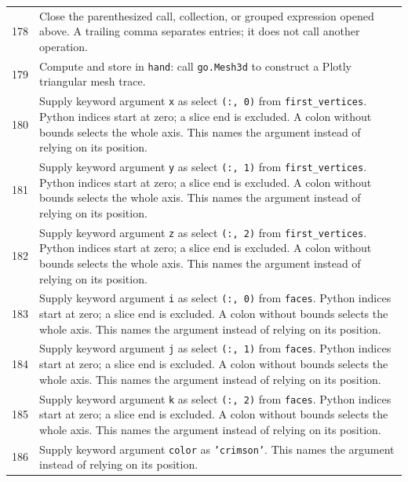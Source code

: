 \documentclass[11pt,a4paper]{book}
\begin{document}
\begin{longtable}{r p{}}
178 & Close the parenthesized call, collection, or grouped expression opened above. A trailing comma separates entries; it does not call another operation. \\

179 & Compute and store in \texttt{hand}: call \texttt{go.Mesh3d} to construct a Plotly triangular mesh trace.  \\

180 & Supply keyword argument \texttt{x} as select \texttt{(:, 0)} from \texttt{first\_vertices}. Python indices start at zero; a slice end is excluded. A colon without bounds selects the whole axis. This names the argument instead of relying on its position. \\

181 & Supply keyword argument \texttt{y} as select \texttt{(:, 1)} from \texttt{first\_vertices}. Python indices start at zero; a slice end is excluded. A colon without bounds selects the whole axis. This names the argument instead of relying on its position. \\

182 & Supply keyword argument \texttt{z} as select \texttt{(:, 2)} from \texttt{first\_vertices}. Python indices start at zero; a slice end is excluded. A colon without bounds selects the whole axis. This names the argument instead of relying on its position. \\

183 & Supply keyword argument \texttt{i} as select \texttt{(:, 0)} from \texttt{faces}. Python indices start at zero; a slice end is excluded. A colon without bounds selects the whole axis. This names the argument instead of relying on its position. \\

184 & Supply keyword argument \texttt{j} as select \texttt{(:, 1)} from \texttt{faces}. Python indices start at zero; a slice end is excluded. A colon without bounds selects the whole axis. This names the argument instead of relying on its position. \\

185 & Supply keyword argument \texttt{k} as select \texttt{(:, 2)} from \texttt{faces}. Python indices start at zero; a slice end is excluded. A colon without bounds selects the whole axis. This names the argument instead of relying on its position. \\

186 & Supply keyword argument \texttt{color} as \texttt{'crimson'}. This names the argument instead of relying on its position. \\


\end{longtable}
\end{document}
